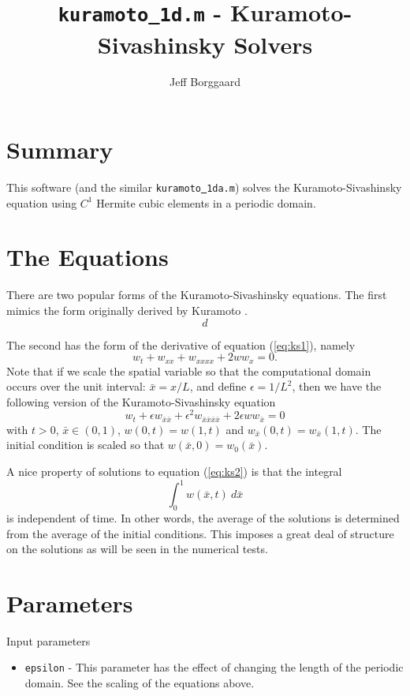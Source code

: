\documentclass[11pt]{article}
\title{{\tt kuramoto\underline{ }1d.m} - Kuramoto-Sivashinsky Solvers}
\author{Jeff Borggaard}
\begin{document}
\maketitle

\section*{Summary}
This software (and the similar {\tt kuramoto\underline{ }1da.m}) solves the 
Kuramoto-Sivashinsky equation using $C^1$ Hermite cubic elements in a 
periodic domain.

\section*{The Equations}
There are two popular forms of the Kuramoto-Sivashinsky equations.  The first
mimics the form originally derived by Kuramoto \cite{kuramoto}.
%
\begin{equation}
\label{eq:ks1}
 d
\end{equation}

The second has the form of the derivative of equation (\ref{eq:ks1}), namely
%
\begin{displaymath}
  w_t + w_{xx} + w_{xxxx} + 2 w w_x = 0.
\end{displaymath}
%
Note that if we scale the spatial variable so that the computational
domain occurs over the unit interval: $\bar{x} = x/L$, and define
$\epsilon = 1/L^2$, then we have the following version of the Kuramoto-Sivashinsky equation
%
\begin{equation}
\label{eq:ks2}
  w_t + \epsilon w_{\bar{x}\bar{x}} + \epsilon^2 w_{\bar{x}\bar{x}\bar{x}\bar{x}} + 2 \epsilon w w_{\bar{x}} = 0
\end{equation}
%
with $t>0$, $\bar{x} \in (0,1)$, $w(0,t) = w(1,t)$ and $w_{\bar{x}}(0,t) = 
w_{\bar{x}}(1,t)$.  The initial condition is scaled so that 
$w(\bar{x},0) = w_0(\bar{x})$.

A nice property of solutions to equation (\ref{eq:ks2}) is that the integral
%
\begin{equation}
\label{eq:w_ave}
  \int_0^1 w(\bar{x},t) \ d\bar{x}
\end{equation}
%
is independent of time.  In other words, the average of the solutions is
determined from the average of the initial conditions.  This imposes a 
great deal of structure on the solutions as will be seen in the numerical
tests.


\section*{Parameters}
Input parameters
%
\begin{itemize}
  \item {\tt epsilon} - \newline
  This parameter has the effect of changing the length of the periodic
  domain.  See the scaling of the equations above.
\end{itemize}
\end{document}
